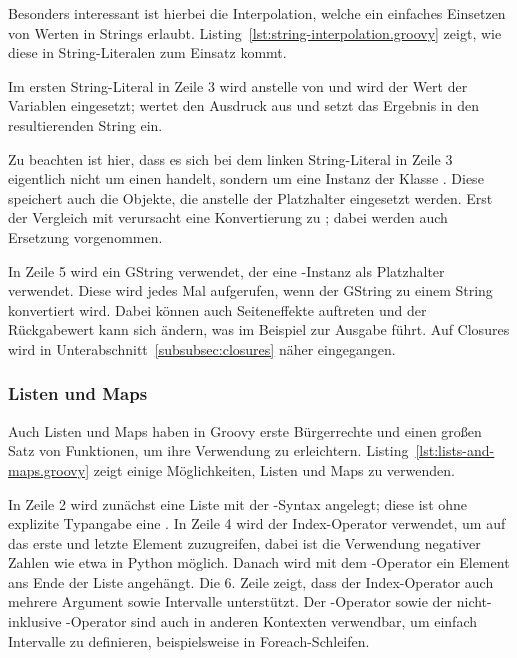 Besonders interessant ist hierbei die Interpolation, welche ein einfaches Einsetzen von Werten in Strings erlaubt.
Listing~\ref{lst:string-interpolation.groovy} zeigt, wie diese in String-Literalen zum Einsatz kommt.


Im ersten String-Literal in Zeile 3 wird anstelle von  und  wird der Wert der Variablen eingesetzt;
 wertet den Ausdruck  aus und setzt das Ergebnis in den resultierenden String ein.

Zu beachten ist hier, dass es sich bei dem linken String-Literal in Zeile 3 eigentlich nicht um einen  handelt, sondern um eine Instanz der Klasse .
Diese speichert auch die Objekte, die anstelle der Platzhalter eingesetzt werden.
Erst der Vergleich mit \code{==} verursacht eine Konvertierung zu ; dabei werden auch Ersetzung vorgenommen.

In Zeile 5 wird ein GString verwendet, der eine -Instanz als Platzhalter verwendet.
Diese wird jedes Mal aufgerufen, wenn der GString zu einem String konvertiert wird.
Dabei können auch Seiteneffekte auftreten und der Rückgabewert kann sich ändern, was im Beispiel zur Ausgabe  führt.
Auf Closures wird in Unterabschnitt~\ref{subsubsec:closures} näher eingegangen.

\subsubsection{Listen und Maps}\label{subsubsec:listen-und-maps}

Auch Listen und Maps haben in Groovy erste Bürgerrechte und einen großen Satz von Funktionen, um ihre Verwendung zu erleichtern.
Listing~\ref{lst:lists-and-maps.groovy} zeigt einige Möglichkeiten, Listen und Maps zu verwenden.


In Zeile 2 wird zunächst eine Liste mit der \code{[]}-Syntax angelegt;
diese ist ohne explizite Typangabe eine .
In Zeile 4 wird der Index-Operator verwendet, um auf das erste und letzte Element zuzugreifen, dabei ist die Verwendung negativer Zahlen wie etwa in Python möglich.
Danach wird mit dem \code{<<}-Operator ein Element ans Ende der Liste angehängt.
Die 6. Zeile zeigt, dass der Index-Operator auch mehrere Argument sowie Intervalle unterstützt.
Der -Operator sowie der nicht-inklusive -Operator sind auch in anderen Kontexten verwendbar, um einfach Intervalle zu definieren, beispielsweise in Foreach-Schleifen.

